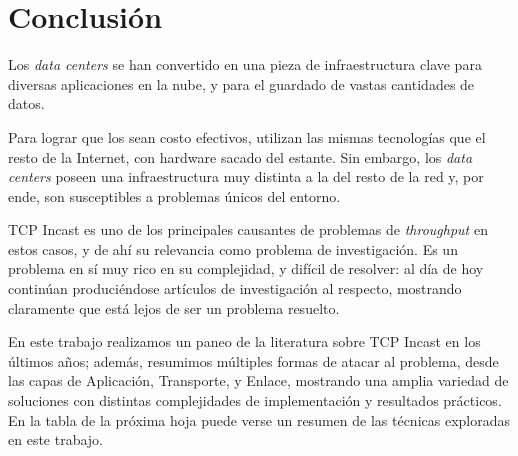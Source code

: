 \documentclass[runningheads,a4paper]{llncs}
\begin{document}
\section{Conclusión} \label{conclusion}


Los \textit{data centers} se han convertido en una pieza de infraestructura clave para diversas aplicaciones en la nube, y para el guardado de vastas cantidades de datos.

Para lograr que los sean costo efectivos, utilizan las mismas tecnologías que el resto de la Internet, con hardware sacado del estante. Sin embargo, los \textit{data centers} poseen una infraestructura muy distinta a la del resto de la red y, por ende, son susceptibles a problemas únicos del entorno.

TCP Incast es uno de los principales causantes de problemas de \textit{throughput} en estos casos, y de ahí su relevancia como problema de investigación. Es un problema en sí muy rico en su complejidad, y difícil de resolver: al día de hoy continúan produciéndose artículos de investigación al respecto, mostrando claramente que está lejos de ser un problema resuelto.

En este trabajo realizamos un paneo de la literatura sobre TCP Incast en los últimos años; además, resumimos múltiples formas de atacar al problema, desde las capas de Aplicación, Transporte, y Enlace, mostrando una amplia variedad de soluciones con distintas complejidades de implementación y resultados prácticos. En la tabla de la próxima hoja puede verse un resumen de las técnicas exploradas en este trabajo.

\newpage

\end{document}
